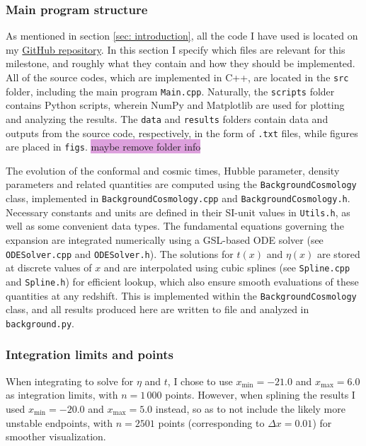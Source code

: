 \documentclass{aa}
\begin{document}
\subsubsection{Main program structure}
As mentioned in section \ref{sec: introduction}, all the code I have used is located on my \href{https://github.com/paljettrosa/AST5220}{GitHub repository}. In this section I specify which files are relevant for this milestone, and roughly what they contain and how they should be implemented. All of the source codes, which are implemented in C++, are located in the \verb|src| folder, including the main program \verb|Main.cpp|. Naturally, the \verb|scripts| folder contains Python scripts, wherein NumPy and Matplotlib are used for plotting and analyzing the results. The \verb|data| and \verb|results| folders contain data and outputs from the source code, respectively, in the form of \verb|.txt| files, while figures are placed in \verb|figs|. \colorbox{Plum}{maybe remove folder info}

The evolution of the conformal and cosmic times, Hubble parameter, density parameters and related quantities are computed using the \verb|BackgroundCosmology| class, implemented in \verb|BackgroundCosmology.cpp| and \verb|BackgroundCosmology.h|. Necessary constants and units are defined in their SI-unit values in \verb|Utils.h|, as well as some convenient data types. The fundamental equations governing the expansion are integrated numerically using a GSL-based ODE solver (see \verb|ODESolver.cpp| and \verb|ODESolver.h|). The solutions for $t(x)$ and $\eta(x)$ are stored at discrete values of $x$ and are interpolated using cubic splines (see \verb|Spline.cpp| and \verb|Spline.h|) for efficient lookup, which also ensure smooth evaluations of these quantities at any redshift. This is implemented within the \verb|BackgroundCosmology| class, and all results produced here are written to file and analyzed in \verb|background.py|. 


\subsubsection{Integration limits and points}
When integrating to solve for $\eta$ and $t$, I chose to use $x_\text{min}=-21.0$ and $x_\text{max}=6.0$ as integration limits, with $n=1\,000$ points. However, when splining the results I used $x_\text{min}=-20.0$ and $x_\text{max}=5.0$ instead, so as to not include the likely more unstable endpoints, with $n=2501$ points (corresponding to $\Delta x = 0.01$) for smoother visualization.
\end{document}
